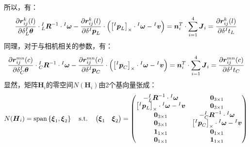 所以，有：
\begin{equation}
  \frac{\partial \boldsymbol{r}_{ij}^k(l)}{\partial \delta {^{I}_{L}\boldsymbol{\theta}}}
  \cdot{{^{I}_{L}}\boldsymbol{R}^{-1}}\cdot{^{I}\boldsymbol{\omega}}-
  \frac{\partial \boldsymbol{r}_{ij}^k(l)}{\partial \delta {^{I}\boldsymbol{p}_L}}
  \cdot
  \left(
  \left[ {^{I}\boldsymbol{p}_L} \right]_\times\cdot{^{I}\boldsymbol{\omega}}-{^{I}\boldsymbol{v}}
  \right) =
  \boldsymbol{n}_i^T\cdot\sum_{i=1}^{4}\boldsymbol{J}_i=
  \frac{\partial \boldsymbol{r}_{ij}^k(l)}{\partial \delta {^{I}t_{L}}}
\end{equation}
同理，对于与相机相关的参数，有：
\begin{equation}
  \frac{\partial \boldsymbol{r}_{ij}^{mn}(c)}{\partial \delta {^{I}_{C}\boldsymbol{\theta}}}
  \cdot{{^{I}_{C}}\boldsymbol{R}^{-1}}\cdot{^{I}\boldsymbol{\omega}}-
  \frac{\partial \boldsymbol{r}_{ij}^{mn}(c)}{\partial \delta {^{I}\boldsymbol{p}_C}}
  \cdot
  \left(
  \left[ {^{I}\boldsymbol{p}_C} \right]_\times\cdot{^{I}\boldsymbol{\omega}}-{^{I}\boldsymbol{v}}
  \right) =
  \boldsymbol{n}_i^T\cdot\sum_{i=1}^{4}\boldsymbol{J}_i=
  \frac{\partial \boldsymbol{r}_{ij}^{mn}(c)}{\partial \delta {^{I}t_{C}}}
\end{equation}
显然，矩阵$\boldsymbol{H}_i$的零空间$N(\boldsymbol{H}_i)$由2个基向量张成：
\begin{equation}
  N(\boldsymbol{H}_i)=\mathrm{span}\left\lbrace
  \boldsymbol{\xi}_1,\boldsymbol{\xi}_2
  \right\rbrace
  \quad\mathrm{s.t.}\quad
  \begin{pmatrix}
    \boldsymbol{\xi}_1 & \boldsymbol{\xi}_2
  \end{pmatrix}=
  \begin{pmatrix}
    -{{^{I}_{L}}\boldsymbol{R}^{-1}}\cdot{^{I}\boldsymbol{\omega}}                     & \boldsymbol{0}_{3\times 1}                                                         \\
    \left[ {^{I}\boldsymbol{p}_L} \right]_\times\cdot{^{I}\boldsymbol{\omega}}-{^{I}\boldsymbol{v}} & \boldsymbol{0}_{3\times 1}                                                         \\
    \boldsymbol{0}_{3\times 1}                                                         & -{{^{I}_{C}}\boldsymbol{R}^{-1}}\cdot{^{I}\boldsymbol{\omega}}                     \\
    \boldsymbol{0}_{3\times 1}                                                         & \left[ {^{I}\boldsymbol{p}_C} \right]_\times\cdot{^{I}\boldsymbol{\omega}}-{^{I}\boldsymbol{v}} \\
    \boldsymbol{1}_{1\times 1}                                                         & \boldsymbol{0}_{1\times 1}                                                         \\
    \boldsymbol{0}_{1\times 1}                                                         & \boldsymbol{1}_{1\times 1}
  \end{pmatrix}
\end{equation}
